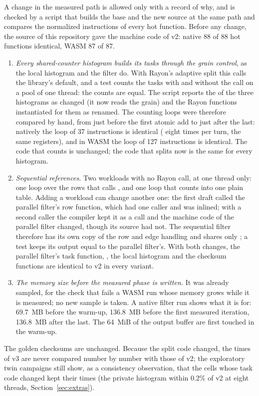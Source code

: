 A change in the measured path is allowed only with a record of why, and is
checked by a script that builds the base and the new source at the same
path and compares the normalized instructions of every hot function. Before
any change, the source of this repository gave the machine code of v2:
native 88 of 88 hot functions identical, WASM 87 of 87.

\begin{enumerate}[leftmargin=2em]
\item \emph{Every shared-counter histogram builds its tasks through the
grain control}, as the local histogram and the filter do. With Rayon's
adaptive split this calls the library's default, and a test counts the
tasks with and without the call on a pool of one thread: the counts are
equal. The script reports the  of the three histograms as
changed (it now reads the grain) and the Rayon functions instantiated for
them as renamed. The counting loops were therefore compared by hand, from
just before the first atomic add to just after the last: natively the loop
of 37 instructions is identical ( eight
times per turn, the same registers), and in WASM the loop of 127
instructions is identical. The code that counts is unchanged; the code that
splits now is the same for every histogram.
\item \emph{Sequential references.} Two workloads with no Rayon call, at
one thread only: one loop over the rows that calls ,
and one loop that counts into one plain table. Adding a workload can change
another one: the first draft called the parallel filter's row function,
which had one caller and was inlined; with a second caller the compiler
kept it as a call and the machine code of the parallel filter changed,
though its source had not. The sequential filter therefore has its own copy
of the row and edge handling and shares only ; a test
keeps its output equal to the parallel filter's. With both changes, the
parallel filter's task function, , the local histogram
and the checksum functions are identical to v2 in every variant.
\item \emph{The memory size before the measured phase is written.} It was
already sampled, for the check that fails a WASM run whose memory grows
while it is measured; no new sample is taken. A native filter run shows
what it is for: 69.7~MB before the warm-up, 136.8~MB before the first
measured iteration, 136.8~MB after the last. The 64~MiB of the output
buffer are first touched in the warm-up.
\end{enumerate}

The golden checksums are unchanged. Because the split code changed, the
times of v3 are never compared number by number with those of v2; the
exploratory twin campaigns still show, as a consistency observation, that
the cells whose task code changed kept their times (the private histogram
within 0.2\% of v2 at eight threads, Section~\ref{sec:extras}).
